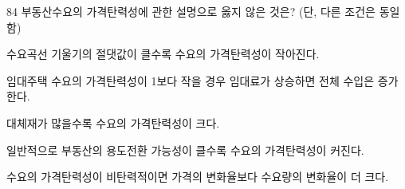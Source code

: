 \begin{question}{84}
부동산수요의 가격탄력성에 관한 설명으로 옳지 않은 것은? (단, 다른 조건은 동일함)
\begin{choices}
  \item 수요곡선 기울기의 절댓값이 클수록 수요의 가격탄력성이 작아진다.
  \item 임대주택 수요의 가격탄력성이 1보다 작을 경우 임대료가 상승하면 전체 수입은 증가한다.
  \item 대체재가 많을수록 수요의 가격탄력성이 크다.
  \item 일반적으로 부동산의 용도전환 가능성이 클수록 수요의 가격탄력성이 커진다.
  \item 수요의 가격탄력성이 비탄력적이면 가격의 변화율보다 수요량의 변화율이 더 크다.
\end{choices}
\end{question}
